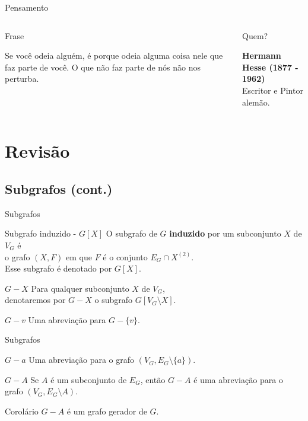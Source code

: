 \documentclass[xcolor=dvipsnames,table]{beamer}
\begin{document}
\begin{frame}{Pensamento}
\begin{columns}
\begin{block}{Frase}
   			\begin{center}
   				{\large Se você odeia alguém, é porque odeia alguma coisa nele que faz parte de você. O que não faz parte de nós não nos perturba.}
   			\end{center}
   		\end{block}		  		
   		\begin{block}{Quem?}
   			\begin{center}
   				{\bf Hermann Hesse (1877 - 1962)} \\Escritor e Pintor alemão.
   			\end{center}
   		\end{block}
   	\end{columns}
   \end{frame}
    
    \section{Revisão}
	\subsection{Subgrafos (cont.)}
	\begin{frame}{Subgrafos}
		\begin{block}{Subgrafo induzido - $G[X]$}
			O subgrafo de $G$ {\bf induzido} por um subconjunto $X$ de $V_G$ é \\o grafo $(X, F)$ em que $F$ é o conjunto $E_G \cap X^{(2)}$. \\Esse subgrafo é denotado por $G[X]$.
		\end{block}  
		\begin{block}{$G - X$}
			Para qualquer subconjunto $X$ de $V_G$, \\denotaremos por $G - X$ o subgrafo $G[V_G \setminus X]$.
		\end{block}  
		\begin{block}{$G - v$}
			Uma abreviação para $G - \{ v \}$.
		\end{block}
	\end{frame}
	
	\begin{frame}{Subgrafos}
		\begin{block}{$G - a$}
			Uma abreviação para o grafo $(V_G, E_G \setminus \{ a \})$.
		\end{block}  
		\begin{block}{$G - A$}
			Se $A$ é um subconjunto de $E_G$, então $G - A$ é uma abreviação para o grafo $(V_G, E_G \setminus A)$.
		\end{block}  
		\begin{block}{Corolário}
			$G - A$ é um grafo gerador de $G$.
		\end{block}
	\end{frame}
\end{document}
